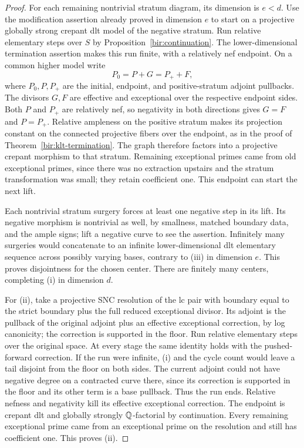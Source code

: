 \begin{proof}
For each remaining nontrivial stratum diagram, its dimension is
$e<d$.  Use the modification assertion already proved in dimension
$e$ to start on a projective globally strong crepant dlt model of
the negative stratum.  Run relative elementary steps over $S$ by
Proposition~\ref{bir:continuation}.  The lower-dimensional
termination assertion makes this run finite, with a relatively nef
endpoint.  On a common higher model write
\begin{equation}
 P_0=P+G=P_++F,
 \label{bir:dlt-lift}
\end{equation}
where $P_0,P,P_+$ are the initial, endpoint, and positive-stratum
adjoint pullbacks.  The divisors $G,F$ are effective and exceptional
over the respective endpoint sides.  Both $P$ and $P_+$ are
relatively nef, so negativity in both directions gives $G=F$ and
$P=P_+$.  Relative ampleness on the positive stratum makes its
projection constant on the connected projective fibers over the
endpoint, as in the proof of Theorem~\ref{bir:klt-termination}.
The graph therefore factors into a projective crepant morphism to
that stratum.  Remaining exceptional primes came from old
exceptional primes, since there was no extraction upstairs and the
stratum transformation was small; they retain coefficient one.
This endpoint can start the next lift.

Each nontrivial stratum surgery forces at least one negative step
in its lift.  Its negative morphism is nontrivial as well, by
smallness, matched boundary data, and the ample signs; lift a
negative curve to see the assertion.  Infinitely many surgeries
would concatenate to an infinite lower-dimensional dlt elementary
sequence across possibly varying bases, contrary to (iii) in
dimension $e$.  This proves disjointness for the chosen center.
There are finitely many centers, completing (i) in dimension $d$.

For (ii), take a projective SNC resolution of the lc pair with
boundary equal to the strict boundary plus the full reduced
exceptional divisor.  Its adjoint is the pullback of the original
adjoint plus an effective exceptional correction, by log canonicity;
the correction is supported in the floor.  Run relative elementary
steps over the original space.  At every stage the same identity
holds with the pushed-forward correction.  If the run were
infinite, (i) and the cycle count would leave a tail disjoint from
the floor on both sides.  The current adjoint could not have
negative degree on a contracted curve there, since its correction
is supported in the floor and its other term is a base pullback.
Thus the run ends.  Relative nefness and negativity kill its
effective exceptional correction.  The endpoint is crepant dlt
and globally strongly $\mathbb{Q}$-factorial by continuation.  Every
remaining exceptional prime came from an exceptional prime on
the resolution and still has coefficient one.  This proves (ii).


\end{proof}
